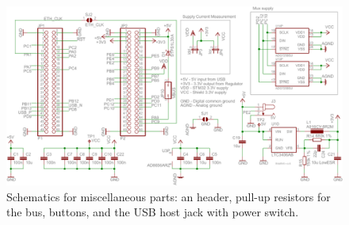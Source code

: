 \begin{figure}[htpb]
  \centering
    \includegraphics[page=5]{bilder/schem.pdf}
  \caption{Schematics for miscellaneous parts: an \iic{} header, pull-up resistors for the \iic{} bus, buttons, and the
    USB host jack with power switch.}
  \label{fig:schem_misc}
\end{figure}